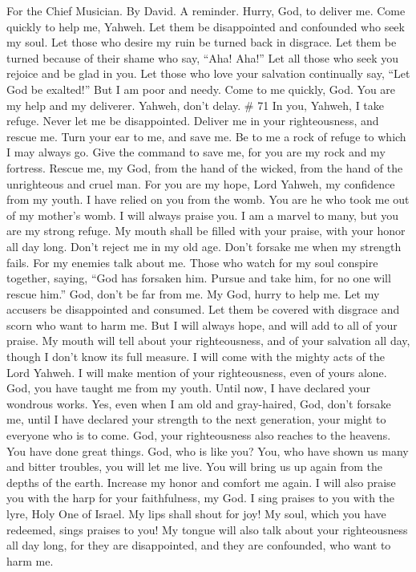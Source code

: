 For the Chief Musician. By David. A reminder.  Hurry, God,
to deliver me. Come quickly to help me, Yahweh.  Let them be
disappointed and confounded who seek my soul. Let those who desire my
ruin be turned back in disgrace.  Let them be turned because
of their shame who say, ``Aha! Aha!''  Let all those who
seek you rejoice and be glad in you. Let those who love your salvation
continually say, ``Let God be exalted!''  But I am poor and
needy. Come to me quickly, God. You are my help and my deliverer.
Yahweh, don't delay. \# 71  In you, Yahweh, I take refuge.
Never let me be disappointed.  Deliver me in your
righteousness, and rescue me. Turn your ear to me, and save me.
 Be to me a rock of refuge to which I may always go. Give
the command to save me, for you are my rock and my fortress.
 Rescue me, my God, from the hand of the wicked, from the
hand of the unrighteous and cruel man.  For you are my hope,
Lord Yahweh, my confidence from my youth.  I have relied on
you from the womb. You are he who took me out of my mother's womb. I
will always praise you.  I am a marvel to many, but you are
my strong refuge.  My mouth shall be filled with your
praise, with your honor all day long.  Don't reject me in my
old age. Don't forsake me when my strength fails.  For my
enemies talk about me. Those who watch for my soul conspire together,
 saying, ``God has forsaken him. Pursue and take him, for
no one will rescue him.''  God, don't be far from me. My
God, hurry to help me.  Let my accusers be disappointed and
consumed. Let them be covered with disgrace and scorn who want to harm
me.  But I will always hope, and will add to all of your
praise.  My mouth will tell about your righteousness, and
of your salvation all day, though I don't know its full measure.
 I will come with the mighty acts of the Lord Yahweh. I
will make mention of your righteousness, even of yours alone.
 God, you have taught me from my youth. Until now, I have
declared your wondrous works.  Yes, even when I am old and
gray-haired, God, don't forsake me, until I have declared your strength
to the next generation, your might to everyone who is to come.
 God, your righteousness also reaches to the heavens. You
have done great things. God, who is like you?  You, who
have shown us many and bitter troubles, you will let me live. You will
bring us up again from the depths of the earth.  Increase
my honor and comfort me again.  I will also praise you with
the harp for your faithfulness, my God. I sing praises to you with the
lyre, Holy One of Israel.  My lips shall shout for joy! My
soul, which you have redeemed, sings praises to you!  My
tongue will also talk about your righteousness all day long, for they
are disappointed, and they are confounded, who want to harm me.

